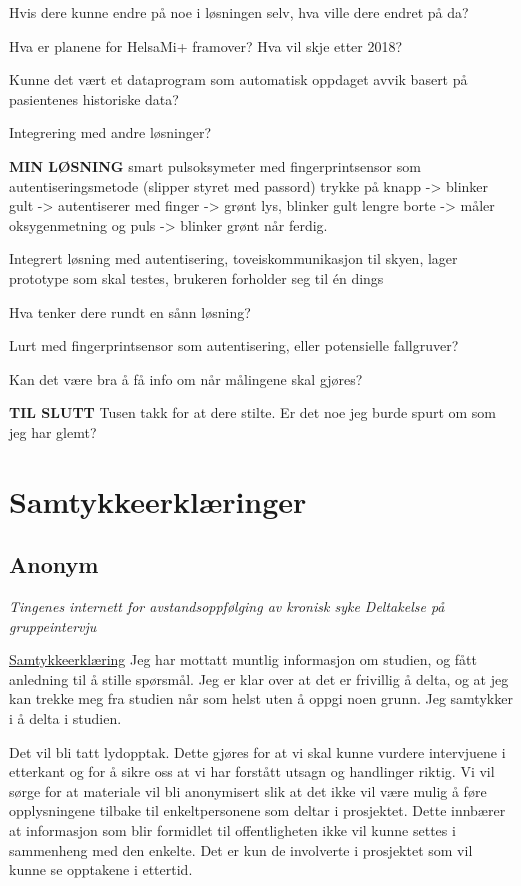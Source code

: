 Hvis dere kunne endre på noe i løsningen selv, hva ville dere endret på da?
 
Hva er planene for HelsaMi+ framover? Hva vil skje etter 2018?
 
Kunne det vært et dataprogram som automatisk oppdaget avvik basert på pasientenes historiske data? 
 
Integrering med andre løsninger? 
 
\textbf{MIN LØSNING}
smart pulsoksymeter med fingerprintsensor som autentiseringsmetode (slipper styret med passord)
trykke på knapp -> blinker gult -> autentiserer med finger -> grønt lys, blinker gult lengre borte -> måler oksygenmetning og puls -> blinker grønt når ferdig.
 
Integrert løsning med autentisering, toveiskommunikasjon til skyen, lager prototype som skal testes, brukeren forholder seg til én dings
 
Hva tenker dere rundt en sånn løsning?
 
Lurt med fingerprintsensor som autentisering, eller potensielle fallgruver? 
 
Kan det være bra å få info om når målingene skal gjøres?
 
\textbf{TIL SLUTT}
Tusen takk for at dere stilte.
Er det noe jeg burde spurt om som jeg har glemt?


\chapter{Samtykkeerklæringer}

\section{Anonym}
\begin{center} \textit{Tingenes internett for avstandsoppfølging av kronisk syke \newline
Deltakelse på gruppeintervju}
\end{center}
\underline{Samtykkeerklæring} \newline
Jeg har mottatt muntlig informasjon om studien, og fått anledning til å stille spørsmål. Jeg er klar over at det er frivillig
å delta, og at jeg kan trekke meg fra studien når som helst uten å oppgi noen grunn. Jeg samtykker i å delta i studien.

Det vil bli tatt lydopptak.  Dette gjøres for at vi skal kunne vurdere intervjuene i etterkant og for å sikre oss at
vi har forstått utsagn og handlinger riktig. Vi vil sørge for at materiale vil bli anonymisert slik at det ikke vil
være mulig å føre opplysningene tilbake til enkeltpersonene som deltar i prosjektet. Dette innbærer at informasjon som
blir formidlet til offentligheten ikke vil kunne settes i sammenheng med den enkelte. Det er kun de involverte i prosjektet
som vil kunne se opptakene i ettertid.

